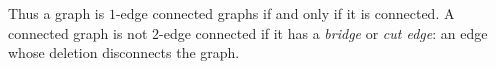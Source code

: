 

\setcounter{section}{3}
\setcounter{subsection}{4}
\setcounter{dfn}{12}

Thus a graph is $1$-edge connected graphs if and only if it is connected.
A connected graph is not $2$-edge connected if it has a \emph{bridge} or \emph{cut edge}: an edge whose deletion disconnects the graph.


